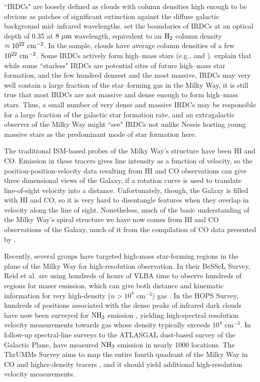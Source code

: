 ``IRDCs" are loosely defined as clouds with column densities high enough to be obvious as patches of significant extinction against the diffuse galactic background mid--infrared wavelengths.  \citet{Peretto2009a} set the boundaries of IRDCs at an optical depth of 0.35 at $8~\rm{}\mu{}m$ wavelength, equivalent to an $\rm{}H_2$ column density $\approx{}10^{22}~\rm{}cm^{-2}$. In the \citet{peretto2010:irdcs-mass-density} sample, clouds have average column densities of a few $10^{22}~\rm{}cm^{-2}$. Some IRDCs actively form high--mass stars (e.g., \citealt{pillai2006:g11} and \citealt{rathborne2007:irdc-msf}). \citet{kauffmann2010:irdcs} explain that while some ``starless" IRDCs are potential sites of future high--mass star formation, and the few hundred densest and the most massive, IRDCs may very well contain a large fraction of the star--forming gas in the Milky Way, it is still true that most IRDCs are not massive and dense enough to form high--mass stars. Thus, a small number of very dense and massive IRDCs may be responsible for a large fraction of the galactic star formation rate, and an extragalactic observer of the Milky Way might ``see" IRDCs not unlike Nessie hosting young massive stars as the predominant mode of star formation here.  

The traditional ISM-based probes of the Milky Way's structure have been HI and CO. Emission in these tracers gives line intensity as a function of velocity, so the position-position-velocity data resulting from HI and CO observations can give three dimensional views of the Galaxy, if a rotation curve is used to translate line-of-sight velocity into a distance. Unfortunately, though, the Galaxy is filled with HI and CO, so it is very hard to disentangle features when they overlap in velocity along the line of sight. Nonetheless, much of the basic understanding of the Milky Way's spiral structure we have now comes from HI and CO observations of the Galaxy, much of it from the compilation of CO data presented by \citet{Dame2001}.

Recently, several groups have targeted high-mass star-forming regions in  the plane of the Milky Way for high-resolution observation. In their BeSSeL Survey, Reid et al. are using hundreds of hours of VLBA time to observe hundreds of regions for maser emission, which can give both distance and kinematic information for very high-density ($n>10^8$ cm$^{-3}$) gas \citep{Reid2009,Brunthaler2011}. In the HOPS Survey, hundreds of positions associated with the dense peaks of infrared dark clouds have now been surveyed for ${\rm NH}_3$ emission \citep{Purcell2012b}, yielding high-spectral resolution velocity measurements towards gas whose density typically exceeds $10^4$ cm$^{-3}$. In follow-up spectral-line surveys to the ATLASGAL \citep{Beuther2012a} dust-based survey of the Galactic Plane, \citet{Wienen2012} have measured ${\rm NH}_3$ emission in nearly 1000 locations. The ThrUMMs Survey aims to map the entire fourth quadrant of the Milky Way in CO and higher-density tracers \citep{BarnesPeter2010}, and it should yield additional high-resolution velocity measurements.

